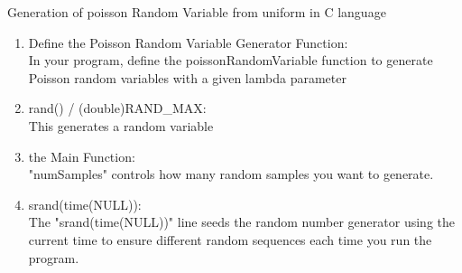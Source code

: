 \documentclass[journal,12pt,onecolumn]{IEEEtran}
\theoremstyle{remark}
\begin{document}
\begin{enumerate}[label=(\alph*)]
 Generation of poisson Random Variable from uniform in C language
 \begin{enumerate}[label=(\roman*)]
 \item Define the Poisson Random Variable Generator Function:\\
In your program, define the poissonRandomVariable function to generate Poisson random variables with a given lambda parameter
\item rand() / (double)RAND\_MAX:\\ This generates a random variable
\item the Main Function:\\
"numSamples" controls how many random samples you want to generate.
\item srand(time(NULL)):\\
The "srand(time(NULL))" line seeds the random number generator using the current time to ensure different random sequences each time you run the program.
\end{enumerate}
\end{enumerate}
\end{document}
